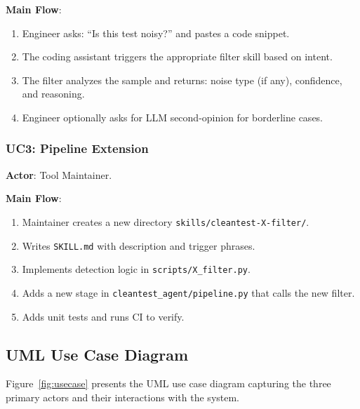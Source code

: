 \documentclass[acmlarge,nonacm,screen]{acmart}
\begin{document}
\textbf{Main Flow}:
\begin{enumerate}
    \item Engineer asks: ``Is this test noisy?'' and pastes a code snippet.
    \item The coding assistant triggers the appropriate filter skill based on intent.
    \item The filter analyzes the sample and returns: noise type (if any), confidence, and reasoning.
    \item Engineer optionally asks for LLM second-opinion for borderline cases.
\end{enumerate}

\subsubsection{UC3: Pipeline Extension}

\textbf{Actor}: Tool Maintainer.

\textbf{Main Flow}:
\begin{enumerate}
    \item Maintainer creates a new directory \texttt{skills/cleantest-X-filter/}.
    \item Writes \texttt{SKILL.md} with description and trigger phrases.
    \item Implements detection logic in \texttt{scripts/X\_filter.py}.
    \item Adds a new stage in \texttt{cleantest\_agent/pipeline.py} that calls the new filter.
    \item Adds unit tests and runs CI to verify.
\end{enumerate}

\subsection{UML Use Case Diagram}

Figure~\ref{fig:usecase} presents the UML use case diagram capturing the three primary actors and their interactions with the system.
\end{document}
